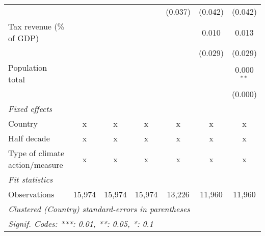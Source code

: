 \begin{tabular}{lcccccc}
                                                                 &             &         &         & (0.037)     & (0.042)       & (0.042)\\   
   Tax revenue (\% of GDP)                                       &             &         &         &             & 0.010         & 0.013\\   
                                                                 &             &         &         &             & (0.029)       & (0.029)\\   
   Population total                                              &             &         &         &             &               & 0.000$^{**}$\\   
                                                                 &             &         &         &             &               & (0.000)\\   
   \emph{Fixed effects}\\
   Country                                                       & x           & x       & x       & x           & x             & x\\  
   Half decade                                                   & x           & x       & x       & x           & x             & x\\  
   Type of climate action/measure                                & x           & x       & x       & x           & x             & x\\  
   \midrule \emph{Fit statistics}\\
   Observations                                                  & 15,974      & 15,974  & 15,974  & 13,226      & 11,960        & 11,960\\  
   \midrule
   \multicolumn{7}{l}{\emph{Clustered (Country) standard-errors in parentheses}}\\
   \multicolumn{7}{l}{\emph{Signif. Codes: ***: 0.01, **: 0.05, *: 0.1}}\\
\end{tabular}
\par\endgroup


